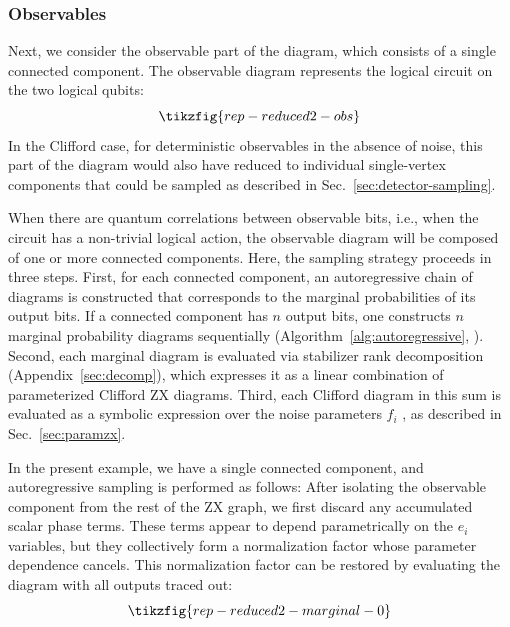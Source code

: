\documentclass[
  a4paper,
  onecolumn,
  11pt,
  allowtoday
]{quantumarticle}
\newcommand{\FF}{\mathrm{GF}(2)}
\begin{document}
\subsubsection{Observables}

Next, we consider the observable part of the diagram, which consists of a single connected component. The observable diagram represents the logical circuit on
the two logical qubits:
\begin{equation}
  \tikzfig{rep-reduced2-obs}
  \label{eqn:obs-only}
\end{equation}
In the Clifford case, for deterministic observables in the absence of noise, this part of the diagram
would also have reduced to individual single-vertex components that could be sampled as described in Sec.~\ref{sec:detector-sampling}.

When there are quantum correlations between observable bits, i.e., when the circuit has
a non-trivial logical action, the observable diagram will be composed of one or more connected components. Here, the sampling strategy proceeds in three steps. First, for each connected component, an autoregressive chain of diagrams is constructed that corresponds to the marginal probabilities of its output bits.
If a connected component has $n$ output bits, one constructs $n$ marginal probability diagrams sequentially (Algorithm~\ref{alg:autoregressive}, \cite{Sutcliffe_2025,kissinger2022simulating}). Second, each marginal diagram is evaluated via stabilizer rank decomposition~\cite{kissinger2022classical,kissinger2022simulating,bravyi2019simulation} (Appendix~\ref{sec:decomp}), which expresses it as a linear combination of parameterized Clifford ZX diagrams. Third, each Clifford diagram in this sum is evaluated as a symbolic expression over the noise parameters $f_i$ \cite{Sutcliffe_2025}, as described in Sec.~\ref{sec:paramzx}.


In the present example, we have a single connected component, and autoregressive sampling is performed as follows:
After isolating the observable component from the rest of the ZX graph, we first discard any accumulated scalar phase terms. These terms appear to depend parametrically on the $e_i$ variables, but they collectively form a normalization factor whose parameter dependence cancels. This normalization factor can be restored by evaluating the diagram with all outputs traced out:
\begin{equation}
  \tikzfig{rep-reduced2-marginal-0}
\end{equation}
\end{document}
